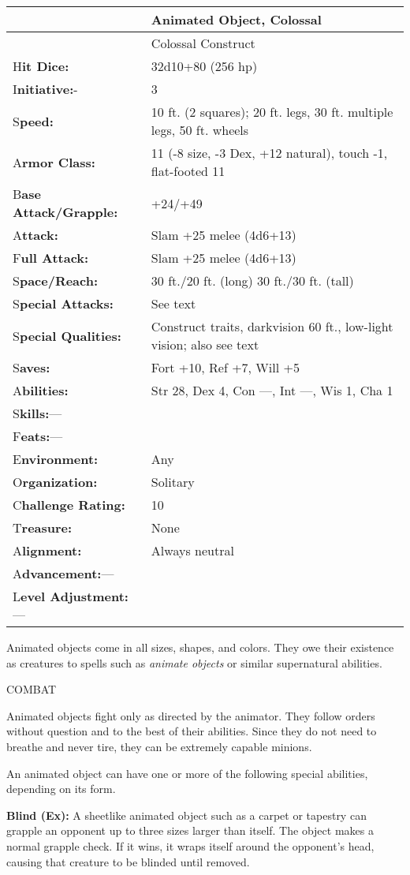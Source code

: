 \documentclass{article}
\begin{document}
\vspace{12pt}
\begin{tabular}{|>{\raggedright}p{86pt}|>{\raggedright}p{239pt}|}
\hline
  & A\textbf{nimated Object, Colossal}\tabularnewline
\hline
  & Colossal Construct\tabularnewline
\hline
H\textbf{it Dice:} & 32d10+80 (256 hp)\tabularnewline
\hline
I\textbf{nitiative:}- & 3\tabularnewline
\hline
S\textbf{peed:} & 10 ft. (2 squares); 20 ft. legs, 30 ft. multiple legs, 50 ft. 
wheels\tabularnewline
\hline
A\textbf{rmor Class:} & 11 (-8 size, -3 Dex, +12 natural), touch -1, flat-footed 
11\tabularnewline
\hline
B\textbf{ase Attack/Grapple:} & +24/+49\tabularnewline
\hline
A\textbf{ttack:} & Slam +25 melee (4d6+13)\tabularnewline
\hline
F\textbf{ull Attack:} & Slam +25 melee (4d6+13)\tabularnewline
\hline
S\textbf{pace/Reach:} & 30 ft./20 ft. (long) 30 ft./30 ft. (tall)\tabularnewline
\hline
S\textbf{pecial Attacks:} & See text\tabularnewline
\hline
S\textbf{pecial Qualities:} & Construct traits, darkvision 60 ft., low-light vision; 
also see text\tabularnewline
\hline
S\textbf{aves:} & Fort +10, Ref +7, Will +5\tabularnewline
\hline
A\textbf{bilities:} & Str 28, Dex 4, Con ---, Int ---, Wis 1, Cha 1\tabularnewline
\hline
S\textbf{kills:}--- & \tabularnewline
\hline
F\textbf{eats:}--- & \tabularnewline
\hline
E\textbf{nvironment:} & Any\tabularnewline
\hline
O\textbf{rganization:} & Solitary\tabularnewline
\hline
C\textbf{hallenge Rating:} & 10\tabularnewline
\hline
T\textbf{reasure:} & None\tabularnewline
\hline
A\textbf{lignment:} & Always neutral\tabularnewline
\hline
A\textbf{dvancement:}--- & \tabularnewline
\hline
L\textbf{evel Adjustment:}--- & \tabularnewline
\hline
\end{tabular}

Animated objects come in all sizes, shapes, and colors. They owe their existence 
as creatures to spells such as \textit{animate objects }or similar supernatural 
abilities.

COMBAT

Animated objects fight only as directed by the animator. They follow orders without 
question and to the best of their abilities. Since they do not need to breathe 
and never tire, they can be extremely capable minions. 

An animated object can have one or more of the following special abilities, depending 
on its form.

\textbf{Blind (Ex):} A sheetlike animated object such as a carpet or tapestry can 
grapple an opponent up to three sizes larger than itself. The object makes a normal 
grapple check. If it wins, it wraps itself around the opponent's head, causing 
that creature to be blinded until removed.
\end{document}
